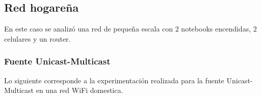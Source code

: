 \subsection{Red hogareña}

En este caso se analizó una red de pequeña escala con 2 notebooks encendidas,
2 celulares y un router.

\subsubsection{Fuente Unicast-Multicast}

 Lo siguiente corresponde a la experimentación realizada para la fuente
 Unicast-Multicast en una red WiFi domestica.
 
\begin{figure}
	\begin{minipage}[b]{0.9\linewidth}
	\end{minipage}
\end{figure}

